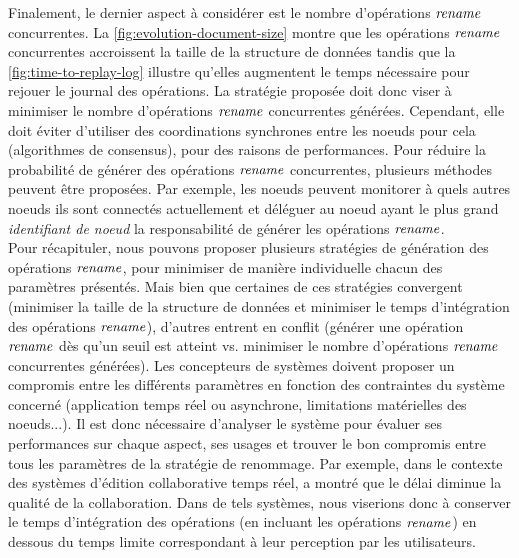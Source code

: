 Finalement, le dernier aspect à considérer est le nombre d'opérations $\mathit{rename}$ concurrentes.
La \autoref{fig:evolution-document-size} montre que les opérations $\mathit{rename}$ concurrentes accroissent la taille de la structure de données tandis que la \autoref{fig:time-to-replay-log}  illustre qu'elles augmentent le temps nécessaire pour rejouer le journal des opérations.
La stratégie proposée doit donc viser à minimiser le nombre d'opérations $\mathit{rename}$ concurrentes générées.
Cependant, elle doit éviter d'utiliser des coordinations synchrones entre les noeuds pour cela (\eg algorithmes de consensus), pour des raisons de performances.
Pour réduire la probabilité de générer des opérations $\mathit{rename}$ concurrentes, plusieurs méthodes peuvent être proposées.
Par exemple, les noeuds peuvent monitorer à quels autres noeuds ils sont connectés actuellement et déléguer au noeud ayant le plus grand \emph{identifiant de noeud} la responsabilité de générer les opérations $\mathit{rename}$.\\

Pour récapituler, nous pouvons proposer plusieurs stratégies de génération des opérations $\mathit{rename}$, pour minimiser de manière individuelle chacun des paramètres présentés.
Mais bien que certaines de ces stratégies convergent (minimiser la taille de la structure de données et minimiser le temps d'intégration des opérations $\mathit{rename}$), d'autres entrent en conflit (générer une opération $\mathit{rename}$ dès qu'un seuil est atteint vs. minimiser le nombre d'opérations $\mathit{rename}$ concurrentes générées).
Les concepteurs de systèmes doivent proposer un compromis entre les différents paramètres en fonction des contraintes du système concerné (application temps réel ou asynchrone, limitations matérielles des noeuds...).
Il est donc nécessaire d'analyser le système pour évaluer ses performances sur chaque aspect, ses usages et trouver le bon compromis entre tous les paramètres de la stratégie de renommage.
Par exemple, dans le contexte des systèmes d'édition collaborative temps réel, \cite{2014-effect-delay-collaborative-editing-ignat} a montré que le délai diminue la qualité de la collaboration.
Dans de tels systèmes, nous viserions donc à conserver le temps d'intégration des opérations (en incluant les opérations $\mathit{rename}$) en dessous du temps limite correspondant à leur perception par les utilisateurs.
